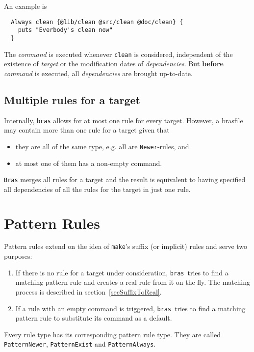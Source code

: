 \documentclass[12pt]{article}
\newcommand{\bras}{\texttt{bras}}
\newcommand{\Bras}{\texttt{Bras}}
\newcommand{\make}{\texttt{make}}
\begin{document}
An example is
\begin{verbatim}
  Always clean {@lib/clean @src/clean @doc/clean} {
    puts "Everbody's clean now"
  }
\end{verbatim}

The \textit{command} is executed whenever \texttt{clean} is
considered, independent of the existence of \textit{target} or the
modification dates of \textit{dependencies}.  But \textbf{before}
\textit{command} is executed, all
\textit{dependencies} are brought up-to-date.

\subsection{Multiple rules for a target}
Internally, \bras{} allows for at most one rule for every
target. However, a brasfile may contain more than one rule for a
target given that
\begin{itemize}
\item they are all of the same type, e.g. all are \texttt{Newer}-rules,
and 
\item at most one of them has a non-empty command.
\end{itemize}
\Bras{} merges all rules for a target and the result is
equivalent to having specified all dependencies of all the rules for
the target in just one rule.


\section{Pattern Rules}

Pattern rules extend on the idea of \make's suffix (or implicit)
rules and serve two purposes:

\begin{enumerate}
\item If there is no rule for a target under consideration, \bras\
tries to find a matching pattern rule and creates a real rule from it on
the fly. The matching process is described in
section~\ref{secSuffixToReal}.
\item If a rule with an empty command is triggered, \bras\ tries
to find a matching pattern rule to substitute its command as a default.
\end{enumerate}

Every rule type has its corresponding pattern rule type. They
are called
\texttt{PatternNewer}, \texttt{PatternExist} and
\texttt{PatternAlways}.
\end{document}

